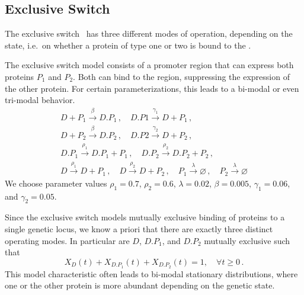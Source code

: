\subsection{Exclusive Switch}
The exclusive switch~\parencite{barzel2008calculation}  has three
different modes of operation, depending on the
 state, i.e.\ on whether a protein of type one or two is bound to
the .
\begin{model}\label{model:excl_switch}
  The exclusive switch model consists of a promoter region
  that can express both proteins $P_1$ and $P_2$. Both can bind to
  the region, suppressing
  the expression of the other protein. For certain parameterizations,
  this leads to a
  bi-modal or even tri-modal behavior.
  \begin{gather*}
    D + P_1 \xrightarrow{\beta} D.P_1\,,\quad
    D.P1 \xrightarrow{\gamma_1} D + P_1  \,,\\
    D + P_2 \xrightarrow{\beta} D.P_2 \,,\quad
    D.P2 \xrightarrow{\gamma_2} D + P_2 \,,\\
    D.P_1 \xrightarrow{\rho_1} D.P_1 + P_1\,, \quad
    D.P_2 \xrightarrow{\rho_2} D.P_2 + P_2\,,\\
    D \xrightarrow{\rho_1} D + P_1\,,\quad
    D \xrightarrow{\rho_2} D + P_2\,,  \quad
    P_1 \xrightarrow{\lambda}\varnothing  \,,\quad
    P_2\xrightarrow{\lambda} \varnothing
  \end{gather*}
  We choose parameter values $\rho_1 = 0.7$, $\rho_2 = 0.6$,
  $\lambda=0.02$, $\beta=0.005$, $\gamma_1 = 0.06$, and $\gamma_2 = 0.05$.
\end{model}

Since the exclusive switch models mutually exclusive binding of
proteins to a single genetic locus,
we know a priori that there are exactly three distinct operating modes.
In particular are $D$, $D.P_1$, and $D.P_2$ mutually exclusive such
that \[X_{D}(t) + X_{D.P_1}(t) + X_{D.P_2}(t) = 1, \quad \forall t\geq 0\,.\]
This model characteristic often leads to bi-modal stationary
distributions, where one or the other protein is more abundant
depending on the genetic state.

